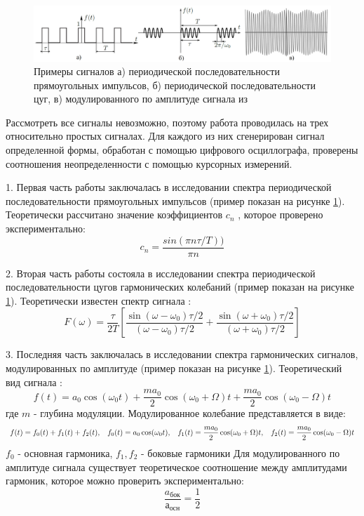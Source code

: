 \documentclass[a4paper,12pt]{article} %
\begin{document}
\begin{figure}[h!]
\begin{center}
\includegraphics[width=\textwidth]{пример}
\caption{Примеры сигналов а) периодической последовательности прямоугольных импульсов, б) периодической последовательности цуг, в) модулированного по амплитуде сигнала из \cite{labnik}} \label{пример}
\end{center}
\end{figure}
Рассмотреть все сигналы невозможно, поэтому работа проводилась на трех относительно простых сигналах. Для каждого из них сгенерирован сигнал определенной формы, обработан с помощью цифрового осциллографа, проверены соотношения неопределенности с помощью курсорных измерений.

1. Первая часть работы заключалась в исследовании спектра периодической последовательности прямоугольных импульсов (пример показан на рисунке \ref{пример}). 
Теоретически рассчитано значение коэффициентов $c_n$ \cite{labnik}, которое проверено экспериментально:
\begin{equation}
c_n  = \dfrac{sin(\pi n \tau / T))}{\pi n}
\end{equation}

2. Вторая часть работы состояла в исследовании спектра периодической последовательности цугов гармонических колебаний (пример показан на рисунке \ref{пример}).
Теоретически известен спектр сигнала \cite{labnik}: 
\begin{equation}
F(\omega) = \dfrac{\tau}{2T}\left[\dfrac{\sin(\omega-\omega_0)\tau /2}
{(\omega-\omega_0)\tau /2}
 + \dfrac{\sin(\omega+\omega_0)\tau /2}{(\omega+\omega_0)\tau /2}\right]
\end{equation}

3. Последняя часть заключалась в исследовании спектра гармонических сигналов, модулированных по амплитуде (пример показан на рисунке \ref{пример}).
Теоретический вид сигнала \cite{labnik}: 
\begin{equation}
f(t) = a_0 \cos (\omega_0 t) +\dfrac{ma_0}{2}\cos (\omega_0 +\Omega)t+\dfrac{ma_0}{2}\cos (\omega_0 -\Omega)t
\end{equation}
где $m$ - глубина модуляции.
Модулированное колебание представляется в виде:
\begin{equation}
f(t)=f_0(t)+f_1(t)+f_2(t),\hspace{3mm} f_0(t)=a_0 \cos (\omega_0 t),\hspace{3mm} f_1(t)=\dfrac{ma_0}{2}\cos (\omega_0 +\Omega)t,\hspace{3mm} f_2(t)=\dfrac{ma_0}{2}\cos (\omega_0 -\Omega)t
\end{equation}
$f_0$ - основная гармоника, $f_1, f_2$ - боковые гармоники
Для модулированного по амплитуде сигнала существует теоретическое соотношение между амплитудами гармоник, которое можно проверить экспериментально:
\begin{equation}
\dfrac{a_{бок}}{а_{осн}}=\frac{1}{2}
\end{equation} 
\end{document}
